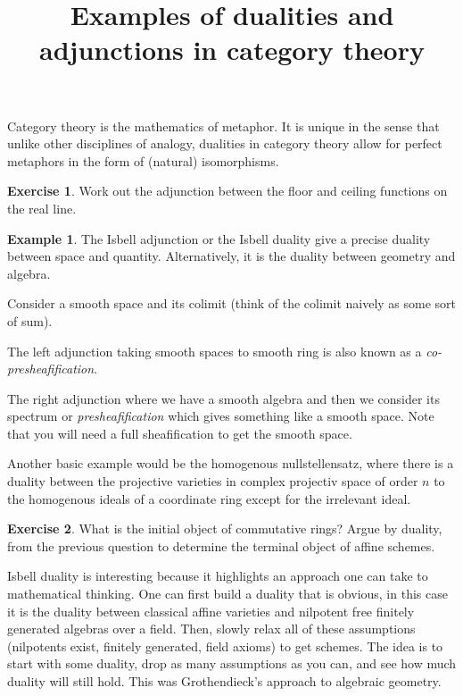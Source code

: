 \documentclass[10pt]{article}
\theoremstyle{plain}%
\theoremstyle{definition}
\newtheorem{example}{Example}[section]
\newtheorem{exercise}{Exercise}[section]
\theoremstyle{remark}
\begin{document}
\title{Examples of dualities and adjunctions in category theory}

\maketitle

Category theory is the mathematics of metaphor. It is unique in the sense that unlike other disciplines of analogy, dualities in category theory allow for perfect metaphors in the form of (natural) isomorphisms.

\begin{exercise}
	Work out the adjunction between the floor and ceiling functions on the real line.
\end{exercise}

\begin{example}
	The Isbell adjunction or the Isbell duality give a precise duality between space and quantity. Alternatively, it is the duality between geometry and algebra.

	Consider a smooth space and its colimit (think of the colimit naively as some sort of sum). 
	
	The left adjunction taking smooth spaces to smooth ring is also known as a \textit{co-presheafification}. 
	
	The right adjunction where we have a smooth algebra and then we consider its spectrum or \textit{presheafification} which gives something like a smooth space. Note that you will need a full sheafification to get the smooth space.

	Another basic example would be the homogenous nullstellensatz, where there is a duality between the projective varieties in complex projectiv space of order $n$ to the homogenous ideals of a coordinate ring except for the irrelevant ideal.
\end{example}

\begin{exercise}
	What is the initial object of commutative rings?
	Argue by duality, from the previous question to determine the terminal object of affine schemes.
\end{exercise}

Isbell duality is interesting because it highlights an approach one can take to mathematical thinking. One can first build a duality that is obvious, in this case it is the duality between classical affine varieties and nilpotent free finitely generated algebras over a field. Then, slowly relax all of these assumptions (nilpotents exist, finitely generated, field axioms) to get schemes. The idea is to start with some duality, drop as many assumptions as you can, and see how much duality will still hold. This was Grothendieck's approach to algebraic geometry.
\end{document}
